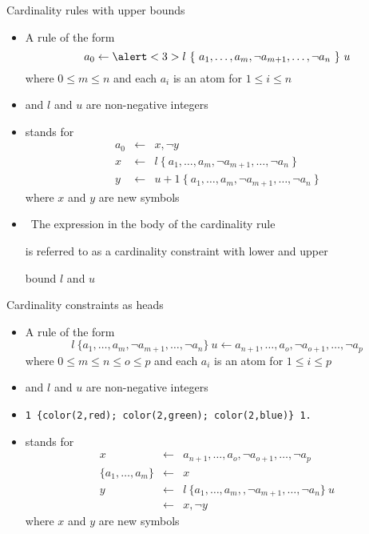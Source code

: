 \begin{frame}{Cardinality rules with upper bounds}
  \begin{itemize}
  \item A rule of the form
    \[
      a_0\leftarrow \alert<3>{l~\{\ a_1,\dots,a_m,\neg a_{m+1},\dots,\neg a_n\ \}~u}
    \]
    where $0\leq m\leq n$ and each $a_i$ is an atom for $1\leq i\leq n$
  \item [] and $l$ and $u$ are non-negative integers
  \item<only@2> []
    stands for
    \[
    \begin{array}{rcl}
      a_0 &\leftarrow& x, \neg y\\
      x   &\leftarrow& l~\{\ a_1,\dots,a_m,\neg a_{m+1},\dots,\neg a_n\ \}\\
      y   &\leftarrow& u{+}1~\{\ a_1,\dots,a_m,\neg a_{m+1},\dots,\neg a_n\ \}
    \end{array}
    \]
    where $x$ and $y$ are new symbols
  \item<only@3>  \
    The expression in the body of the cardinality rule

    is referred to as a \alert<3>{cardinality constraint} with lower and upper

    bound $l$ and $u$
  \end{itemize}
\end{frame}
\begin{frame}[fragile]{Cardinality constraints as heads}
  \begin{itemize}
  \item A rule of the form
    \[
    l~\{a_1,\dots,a_m,\neg a_{m+1},\dots,\neg a_n\}~u\leftarrow a_{n+1},\dots,a_o,\neg a_{o+1},\dots,\neg a_p
    \]
    where $0\leq m\leq n\leq o\leq p$ and each $a_i$ is an atom for $1\leq i\leq p$
  \item [] and $l$ and $u$ are non-negative integers
  \item<only@2> 
\begin{lstlisting}[basicstyle=\ttfamily\small]
1 {color(2,red); color(2,green); color(2,blue)} 1.
\end{lstlisting}
  \item<only@3> []
    stands for
    \[
      \begin{array}{rcl}
        x                 &\leftarrow& a_{n+1},\dots,a_o, \neg a_{o+1},\dots,\neg a_p\\
        \{a_1,\dots,a_m\} &\leftarrow& x\\
        y                 &\leftarrow& l~\{a_1,\dots,a_m,,\neg a_{m+1},\dots,\neg a_n\}~u\\
                          &\leftarrow& x, \neg y
      \end{array}
    \]
    where $x$ and $y$ are new symbols
  \end{itemize}
\end{frame}
